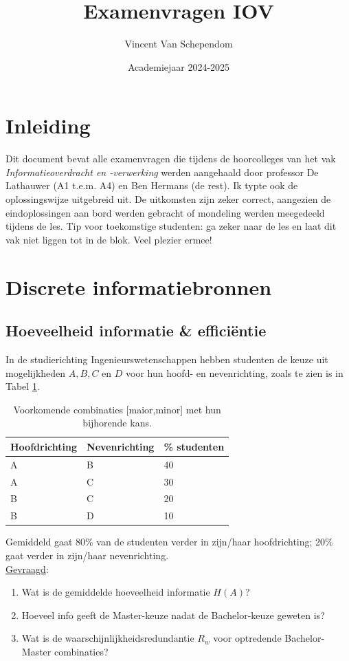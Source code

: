 \documentclass{kuburgiearticle}
\title{Examenvragen IOV}
\author{Vincent Van Schependom}
\date{Academiejaar 2024-2025}
\begin{document}
	\maketitle

	\section*{Inleiding}

	Dit document bevat alle examenvragen die tijdens de hoorcolleges van het vak \textit{Informatieoverdracht en -verwerking} werden aangehaald door professor De Lathauwer (A1 t.e.m. A4) en Ben Hermans (de rest). Ik typte ook de oplossingswijze uitgebreid uit. De uitkomsten zijn zeker correct, aangezien de eindoplossingen aan bord werden gebracht of mondeling werden meegedeeld tijdens de les. Tip voor toekomstige studenten: ga zeker naar de les en laat dit vak niet liggen tot in de blok. Veel plezier ermee!

	\section{Discrete informatiebronnen}

	\subsection{Hoeveelheid informatie \& efficiëntie}

	In de studierichting Ingenieurswetenschappen hebben studenten de keuze uit mogelijkheden \(A, B, C\) en \(D\) voor hun hoofd- en nevenrichting, zoals te zien is in Tabel \ref{tab:mogelijkheden}.

	\begin{table}[h!]
		\centering
		\begin{tabular}{l | l | l}
		Hoofdrichting & Nevenrichting & \% studenten \\ \hline
		A & B & 40 \\
		A & C & 30 \\
		B & C & 20 \\
		B & D & 10
		\end{tabular}
		\caption{Voorkomende combinaties [maior,minor] met hun bijhorende kans.}
		\label{tab:mogelijkheden}
	\end{table}

	Gemiddeld gaat 80\% van de studenten verder in zijn/haar hoofdrichting; 20\% gaat verder in zijn/haar nevenrichting.\\

	\underline{Gevraagd}:
	\begin{enumerate}
		\item Wat is de gemiddelde hoeveelheid informatie \(H(A)\)?
		\item Hoeveel info geeft de Master-keuze nadat de Bachelor-keuze geweten is?
		\item Wat is de waarschijnlijkheidsredundantie \(R_w\) voor optredende Bachelor-Master combinaties?
	\end{enumerate}
\end{document}
